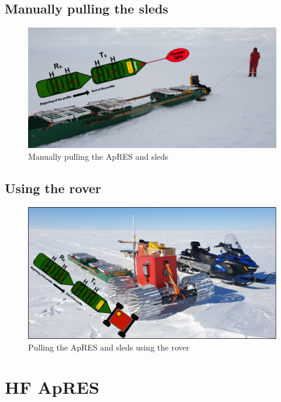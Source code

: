 \documentclass[a4paper,12pt]{article}
\begin{document}
\subsection{Manually pulling the sleds}
\begin{figure}[H]
	\includegraphics[width=\linewidth]{Figures/MPA_manual.pdf}
	\caption{Manually pulling the ApRES and sleds}
	\label{fig_MPA_manual}
\end{figure}

\subsection{Using the rover}
\begin{figure}[H]
	\includegraphics[width=\linewidth]{Figures/MPA_rover.pdf}
	\caption{Pulling the ApRES and sleds using the rover}
	\label{fig_MPA_rover}
\end{figure}
\pagebreak
\section{HF ApRES}
\label{SecHFApRES}
\end{document}
